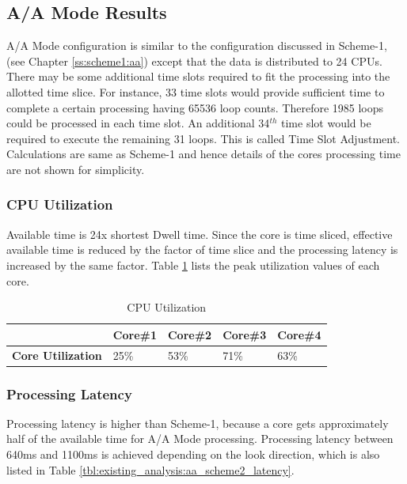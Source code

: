 \subsection{A/A Mode Results}
\label{ss:scheme2:aa}
A/A Mode configuration is similar to the configuration discussed in Scheme-1, (see Chapter \ref{ss:scheme1:aa}) except that the data is distributed to 24 CPUs. There may be some additional time slots required to fit the processing into the allotted time slice. For instance, 33 time slots would provide sufficient time to complete a certain processing having 65536 loop counts. Therefore 1985 loops could be processed in each time slot. An additional 34$^{th}$ time slot would be required to execute the remaining 31 loops. This is called Time Slot Adjustment. Calculations are same as Scheme-1 and hence details of the cores processing time are not shown for simplicity.

\subsubsection{CPU Utilization}
\label{sss:scheme2:cpu_util}
Available time is 24x shortest Dwell time. Since the core is time sliced, effective available time is reduced by the factor of time slice and the processing latency is increased by the same factor. Table \ref{tbl:existing_analysis:aa_scheme2_cpu_util} lists the peak utilization values of each core.

\begin{table}[h!]
	\centering
	\begin{tabular}{|l|l|l|l|l|} 
	 \hline
	 & \textbf{Core\#1} & \textbf{Core\#2} & \textbf{Core\#3} & \textbf{Core\#4} \\ \hline
	 \textbf{Core Utilization} & 25\% & 53\% & 71\% & 63\% \\ \hline
	\end{tabular}
	\caption{CPU Utilization}
	\label{tbl:existing_analysis:aa_scheme2_cpu_util}
\end{table}

\subsubsection{Processing Latency}
\label{sss:scheme2:latency}
Processing latency is higher than Scheme-1, because a core gets approximately half of the available time for A/A Mode processing. Processing latency between 640ms and 1100ms is achieved depending on the look direction, which is also listed in Table \ref{tbl:existing_analysis:aa_scheme2_latency}.

